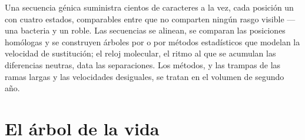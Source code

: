 \begin{remark}\label{rem:b1:classifying-biodiversity:molecular}
Una secuencia génica suministra cientos de caracteres a la vez, cada
posición un  con cuatro estados, comparables entre  que no
comparten ningún rasgo visible --- una bacteria y un roble. Las secuencias
se alinean, se comparan las posiciones homólogas y se construyen árboles por
 o por métodos estadísticos que modelan la velocidad de
sustitución; el reloj molecular, el ritmo al que se acumulan las diferencias
neutras, data las separaciones. Los métodos, y las trampas de las ramas
largas y las velocidades desiguales, se tratan en el volumen de segundo año.
\end{remark}

\section{El árbol de la vida}

